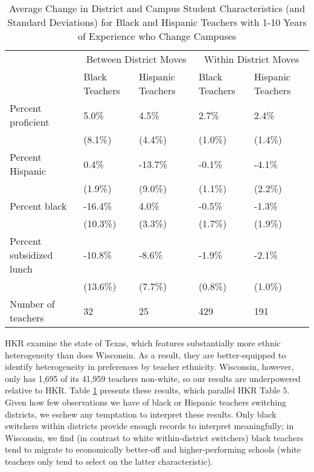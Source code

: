 \documentclass[]{article}
\begin{document}
\begin{table}[htbp]
\centering
\begin{tabular}{lp{}p{}p{}p{}}
  \hline
 & \multicolumn{2}{c}{Between District Moves} & \multicolumn{2}{c}{Within District Moves}\\ \cline{2-5}
 & Black Teachers & Hispanic Teachers & Black Teachers & Hispanic Teachers \\
  \hline
Percent proficient & 5.0\% & 4.5\% & 2.7\% & 2.4\% \\ 
   & (8.1\%) & (4.4\%) & (1.0\%) & (1.4\%) \\ 
  Percent Hispanic & 0.4\% & -13.7\% & -0.1\% & -4.1\% \\ 
   & (1.9\%) & (9.0\%) & (1.1\%) & (2.2\%) \\ 
  Percent black & -16.4\% & 4.0\% & -0.5\% & -1.3\% \\ 
   & (10.3\%) & (3.3\%) & (1.7\%) & (1.9\%) \\ 
  Percent subsidized lunch & -10.8\% & -8.6\% & -1.9\% & -2.1\% \\ 
   & (13.6\%) & (7.7\%) & (0.8\%) & (1.0\%) \\ 
  Number of teachers & 32 & 25 & 429 & 191 \\ 
   \hline
\end{tabular}
\caption{Average Change in District and Campus Student Characteristics (and Standard Deviations) for Black and Hispanic Teachers with 1-10 Years of Experience who Change Campuses} 
\label{tbl:change_by_eth}
\end{table}

HKR examine the state of Texas, which features substantially more ethnic
heterogeneity than does Wisconsin. As a result, they are better-equipped
to identify heterogeneity in preferences by teacher ethnicity.
Wisconsin, however, only has 1,695 of its 41,959 teachers non-white, so
our results are underpowered relative to HKR. Table
\ref{tbl:change_by_eth} presents these results, which parallel HKR Table
5. Given how few observations we have of black or Hispanic teachers
switching districts, we eschew any temptation to interpret these
results. Only black switchers within districts provide enough records to
interpret meaningfully; in Wisconsin, we find (in contrast to white
within-district switchers) black teachers tend to migrate to
economically better-off and higher-performing schools (white teachers
only tend to select on the latter characteristic).
\end{document}
